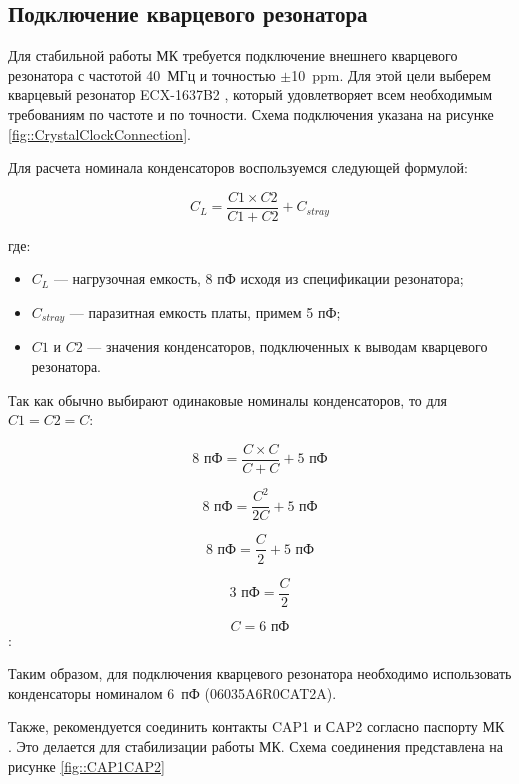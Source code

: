 
\subsection{Подключение кварцевого резонатора}

Для стабильной работы МК требуется подключение внешнего кварцевого резонатора с частотой 40~МГц и точностью $\pm$10~ppm. Для этой цели выберем кварцевый резонатор ECX-1637B2 \cite{datasheet::CrystalClock}, который удовлетворяет всем необходимым требованиям по частоте и по точности. Схема подключения указана на рисунке \ref{fig::CrystalClockConnection}.


Для расчета номинала конденсаторов воспользуемся следующей формулой:

\[
C_L = \frac{C1 \times C2}{C1 + C2} + C_{stray}
\]

где:
\begin{itemize}
	\item \( C_L \) — нагрузочная емкость, 8 пФ исходя из спецификации резонатора;
	\item \( C_{stray} \) — паразитная емкость платы, примем 5 пФ;
	\item \( C1 \) и \( C2 \) — значения конденсаторов, подключенных к выводам кварцевого резонатора.
\end{itemize}

Так как обычно выбирают одинаковые номиналы конденсаторов, то для \( C1 = C2 = C \):

\[
8 \text{ пФ} = \frac{C \times C}{C + C} + 5 \text{ пФ}
\]

\[
8 \text{ пФ} = \frac{C^2}{2C} + 5 \text{ пФ}
\]

\[
8 \text{ пФ} = \frac{C}{2} + 5 \text{ пФ}
\]

\[
3 \text{ пФ} = \frac{C}{2}
\]

\[
C = 6 \text{ пФ}
\]:

Таким образом, для подключения кварцевого резонатора необходимо использовать конденсаторы номиналом 6~пФ (06035A6R0CAT2A).

Также, рекомендуется соединить контакты CAP1 и СAP2 согласно паспорту МК \cite{datasheet::ESP32}. Это делается для стабилизации работы МК. Схема соединения представлена на рисунке \ref{fig::CAP1CAP2}

